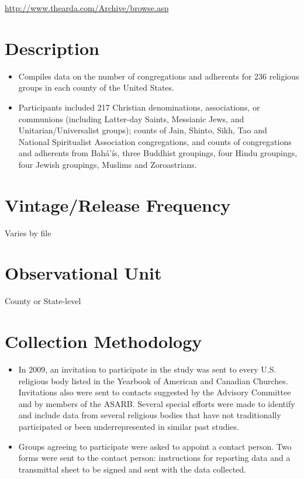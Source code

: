 \documentclass[
]{book}
\providecommand{\tightlist}{%
  \setlength{\itemsep}{0pt}\setlength{\parskip}{0pt}}
\begin{document}
\url{http://www.thearda.com/Archive/browse.asp}

\hypertarget{description-95}{%
\section{Description}\label{description-95}}

\begin{itemize}
\tightlist
\item
  Compiles data on the number of congregations and adherents for 236 religious groups in each county of the United States.
\item
  Participants included 217 Christian denominations, associations, or communions (including Latter-day Saints, Messianic Jews, and Unitarian/Universalist groups); counts of Jain, Shinto, Sikh, Tao and National Spiritualist Association congregations, and counts of congregations and adherents from Bahá'ís, three Buddhist groupings, four Hindu groupings, four Jewish groupings, Muslims and Zoroastrians.
\end{itemize}

\hypertarget{vintagerelease-frequency-95}{%
\section{Vintage/Release Frequency}\label{vintagerelease-frequency-95}}

Varies by file

\hypertarget{observational-unit-95}{%
\section{Observational Unit}\label{observational-unit-95}}

County or State-level

\hypertarget{collection-methodology-95}{%
\section{Collection Methodology}\label{collection-methodology-95}}

\begin{itemize}
\tightlist
\item
  In 2009, an invitation to participate in the study was sent to every U.S. religious body listed in the Yearbook of American and Canadian Churches. Invitations also were sent to contacts suggested by the Advisory Committee and by members of the ASARB. Several special efforts were made to identify and include data from several religious bodies that have not traditionally participated or been underrepresented in similar past studies.
\item
  Groups agreeing to participate were asked to appoint a contact person. Two forms were sent to the contact person: instructions for reporting data and a transmittal sheet to be signed and sent with the data collected.
\end{itemize}
\end{document}
